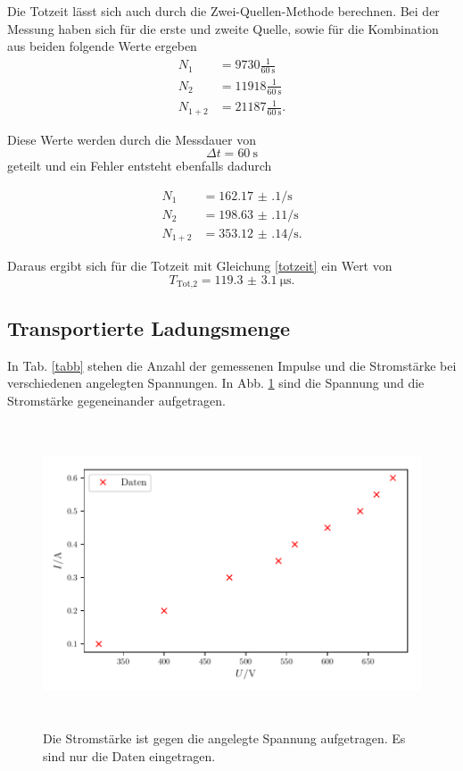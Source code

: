 \noindent Die Totzeit lässt sich auch durch die Zwei-Quellen-Methode berechnen. 
Bei der Messung haben sich für die erste und zweite Quelle, sowie für die Kombination aus beiden folgende Werte ergeben
\begin{align*} 
   N_1 &= 9730 \frac{1}{\SI{60}{\second}}\\
   N_2 &= 11918 \frac{1}{\SI{60}{\second}} \\
   N_{1+2} &= 21187 \frac{1}{\SI{60}{\second}}.
\end{align*}

\noindent Diese Werte werden durch die Messdauer von
\begin{equation*}
    \Delta t = \SI{60}{\second}
\end{equation*}
geteilt und ein Fehler entsteht ebenfalls dadurch %

\begin{align*} 
   N_1 &= \num{162.17(10)} \si{\per\second}\\
   N_2 &= \num{198.63(11)} \si{\per\second} \\
   N_{1+2} &=\num{353.12(14)} \si{\per\second}.
\end{align*}

\noindent Daraus ergibt sich für die Totzeit mit Gleichung \eqref{totzeit}
ein Wert von 
\begin{equation*} 
    T_\text{Tot,2} = \SI{119.3(31)}{\micro\second}.
\end{equation*} 

\subsection{Transportierte Ladungsmenge}
In Tab. \ref{tabb} stehen die Anzahl der gemessenen Impulse und die Stromstärke bei verschiedenen angelegten Spannungen.
In Abb. \ref{fig2} sind die Spannung und die Stromstärke gegeneinander aufgetragen. 



\begin{figure}
    \centering
    \includegraphics[width=15cm, height=9cm]{build/plot2.pdf}
    \caption{Die Stromstärke ist gegen die angelegte Spannung aufgetragen. Es sind nur die Daten eingetragen.}
    \label{fig2}
\end{figure}

